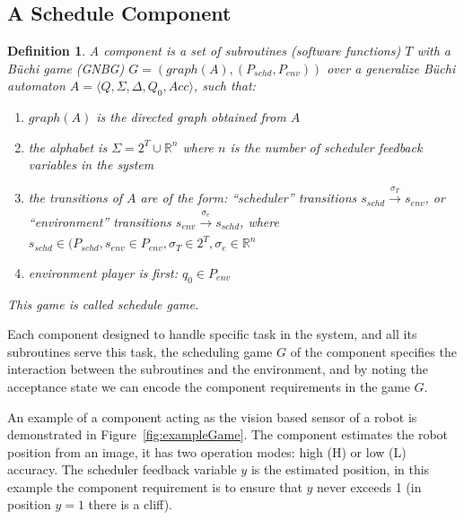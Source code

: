 \documentclass[ twoside, 12pt ]{article}
\newcommand\R{{\mathbb R}}
\newtheorem{dfn}{Definition} %
\newcommand{\commentOut}[1]{}
\begin{document}
\subsection{A Schedule Component}

\commentOut{ %
\begin{dfn}
    A component is a set of subroutines (software functions) $T$ with a non-deterministic B{\"u}chi automaton (NBA) $A= \left < Q,\Sigma,\Delta,Q_0,Acc \right > $ called  ``Guarded automaton'', with the \textit{alphabet} is $\Sigma = 2^{T} \times \R^n$ where $n$ is the number of scheduler feedback variables in the system.
\end{dfn}
}

\begin{dfn}
    A component is a set of subroutines (software functions) $T$ with a B{\"u}chi game (GNBG) $G=(graph(A),(P_{schd}, P_{env}))$ over a generalize B{\"u}chi automaton $A= \langle Q,\Sigma,\Delta,Q_0,Acc \rangle $, such that:
    \begin{enumerate}
        \item $graph(A)$ is the directed graph obtained from $A$
        \item the \textit{alphabet} is $\Sigma = 2^{T} \cup \R^n$ where $n$ is the number of scheduler feedback variables in the system
        \item the transitions of $A$ are of the form: ``scheduler'' transitions $s_{schd} \xrightarrow[]{\sigma_{T}} s_{env}$,  or ``environment'' transitions $s_{env} \xrightarrow[]{\sigma_{e}} s_{schd}$, where $s_{schd} \in (P_{schd}, s_{env} \in P_{env}, \sigma_{T} \in 2^{T}, \sigma_{e} \in \R^n $
        \item environment player is first: $q_0 \in P_{env}$ 
    \end{enumerate}
    This game is called schedule game.
\end{dfn}

Each component designed to handle specific task in the system, and all its subroutines serve this task, the scheduling game $G$ of the component specifies the interaction between the subroutines and the environment, and by noting the acceptance state we can encode the component requirements in the game $G$.

An example of a component acting as the vision based sensor of a robot is demonstrated in Figure~\ref{fig:exampleGame}. 
The component estimates the robot position from an image, it has two operation modes: high (H) or low (L) accuracy.
The scheduler feedback variable $y$ is the estimated position, in this example the component requirement is to ensure that $y$ never exceeds 1 (in position $y=1$ there is a cliff).
\end{document}
